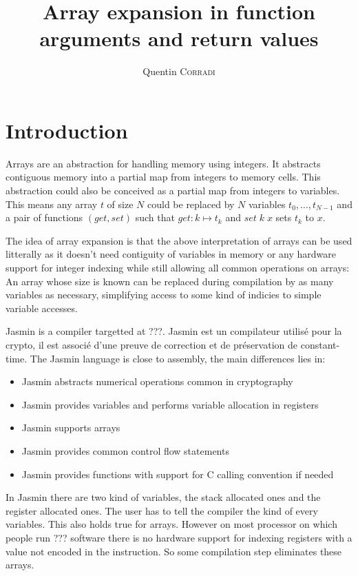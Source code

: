 \documentclass{article}
\title{Array expansion in function arguments and return values}
\author{Quentin \textsc{Corradi}}
\begin{document}
\maketitle

\section{Introduction}

Arrays are an abstraction for handling memory using integers. It abstracts
contiguous memory into a partial map from integers to memory cells. This
abstraction could also be conceived as a partial map from integers to variables.
This means any array \(t\) of size \(N\) could be replaced by \(N\) variables
\(t_0, \dots, t_{N - 1}\) and a pair of functions
\((\mathit{get}, \mathit{set})\) such that \(\mathit{get} : k \mapsto t_k\) and
\(\mathit{set}\;k\;x\) sets \(t_k\) to \(x\).

\smallskip

The idea of array expansion is that the above interpretation of arrays can be
used litterally as it doesn't need contiguity of variables in memory or any
hardware support for integer indexing while still allowing all common operations
on arrays: An array whose size is known can be replaced during compilation by as
many variables as necessary, simplifying access to some kind of indicies to
simple variable accesses.

\smallskip

Jasmin is a compiler targetted at ???.
 Jasmin est un compilateur utilisé pour la crypto, il est associé d'une preuve
 de correction et de préservation de constant-time.
The Jasmin language is close to assembly, the main differences lies in:
\begin{itemize}
\item Jasmin abstracts numerical operations common in cryptography
\item Jasmin provides variables and performs variable allocation in registers
\item Jasmin supports arrays
\item Jasmin provides common control flow statements
\item Jasmin provides functions with support for C calling convention if needed
\end{itemize}\smallskip

In Jasmin there are two kind of variables, the stack allocated ones and the
register allocated ones. The user has to tell the compiler the kind of every
variables. This also holds true for arrays. However on most processor on which
people run ??? software there is no hardware support for indexing registers with
a value not encoded in the instruction. So some compilation step eliminates
these arrays.
\end{document}
